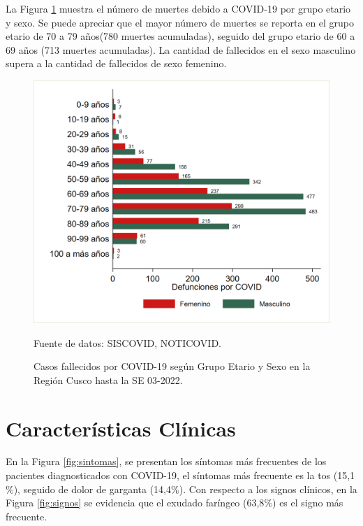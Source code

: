 \documentclass[12pt,a4paper,openany]{book}
\begin{document}
La Figura  \ref{fig:fallecidos_edad_sexo}  muestra el número de muertes debido a COVID-19 por grupo etario y sexo. Se puede apreciar que el mayor número de muertes se reporta en el grupo etario de 70 a 79 años(780 muertes acumuladas), seguido del grupo etario de 60 a 69 años (713 muertes acumuladas). La cantidad de fallecidos en el sexo masculino supera a la cantidad de fallecidos de sexo femenino.
	\begin{figure}[h]
		\caption{Casos fallecidos por COVID-19 según Grupo Etario y Sexo en la Región Cusco hasta la SE 03-2022.}\label{fig:fallecidos_edad_sexo}
		\begin{center}
			\includegraphics[width=0.75\linewidth]{../figuras/defunciones_etapavida}
		\end{center}
		{\footnotesize {Fuente de datos: SISCOVID, NOTICOVID.}}
	\end{figure}


\cleardoublepage


\clearpage

\section*{Características Clínicas}


\noindent En la Figura \ref{fig:sintomas}, se presentan los síntomas más frecuentes de los pacientes diagnosticados con COVID-19, el síntomas más frecuente es la tos (15,1$\%$), seguido de dolor de garganta (14,4$\%$). Con respecto a los signos clínicos, en la Figura \ref{fig:signos} se evidencia que el exudado faríngeo (63,8$\%$) es el signo más frecuente. 
\end{document}
